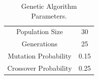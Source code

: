 \begin{table}[h!]
    \caption{Genetic Algorithm Parameters.}
    \vspace{-0.15in}
	\centering
    \begin{tabular}{|| c | c ||}
    	\hline
        Population Size & 30 \\
        Generations & 25 \\
        Mutation Probability & 0.15 \\
        Crossover Probability & 0.25 \\
        \hline
    \end{tabular}
    \label{GA_param_table}
\end{table}








